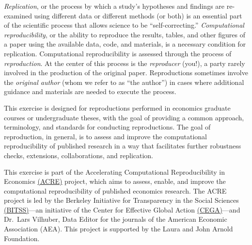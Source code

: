 \documentclass[]{book}
\begin{document}
\emph{Replication}, or the process by which a study's hypotheses and findings are re-examined using different data or different methods (or both) \citep{King95} is an essential part of the scientific process that allows science to be ``self-correcting.'' \emph{Computational reproducibility}, or the ability to reproduce the results, tables, and other figures of a paper using the available data, code, and materials, is a necessary condition for replication. Computational reproducibility is assessed through the process of \emph{reproduction}. At the center of this process is the \emph{reproducer} (you!), a party rarely involved in the production of the original paper. Reproductions sometimes involve the \emph{original author} (whom we refer to as ``the author'') in cases where additional guidance and materials are needed to execute the process.

This exercise is designed for reproductions performed in economics graduate courses or undergraduate theses, with the goal of providing a common approach, terminology, and standards for conducting reproductions. The goal of reproduction, in general, is to assess and improve the computational reproducibility of published research in a way that facilitates further robustness checks, extensions, collaborations, and replication.

This exercise is part of the Accelerating Computational Reproducibility in Economics \href{https://www.bitss.org/ecosystem/acre/}{(ACRE)} project, which aims to assess, enable, and improve the computational reproducibility of published economics research. The ACRE project is led by the Berkeley Initiative for Transparency in the Social Sciences \href{https://bitss.org}{(BITSS)}---an initiative of the Center for Effective Global Action \href{https://cega.berkeley.edu/}{(CEGA)}---and Dr.~Lars Vilhuber, Data Editor for the journals of the American Economic Association (AEA). This project is supported by the Laura and John Arnold Foundation.
\end{document}
